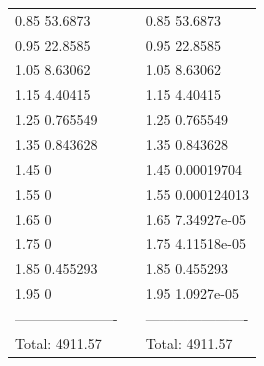 \documentclass[12pt,a4paper]{article}
\theoremstyle{dotless}
\begin{document}
\begin{appendix}
\begin {center}
\begin{tabular}{lcl}
  0.85       53.6873&&  0.85       53.6873\\
  0.95       22.8585&&  0.95       22.8585\\
  1.05       8.63062&&  1.05       8.63062\\
  1.15       4.40415&&  1.15       4.40415\\
  1.25      0.765549&&  1.25      0.765549\\
  1.35      0.843628&&  1.35      0.843628\\
  1.45             0&&  1.45    0.00019704\\
  1.55             0&&  1.55   0.000124013\\
  1.65             0&&  1.65   7.34927e-05\\
  1.75             0&&  1.75   4.11518e-05\\
  1.85      0.455293&&  1.85      0.455293\\
  1.95             0&&  1.95    1.0927e-05\\
----------------------&&----------------------\\
Total:       4911.57&&Total:       4911.57

\end{tabular}
\end{center}

\end{appendix}
\end{document}
